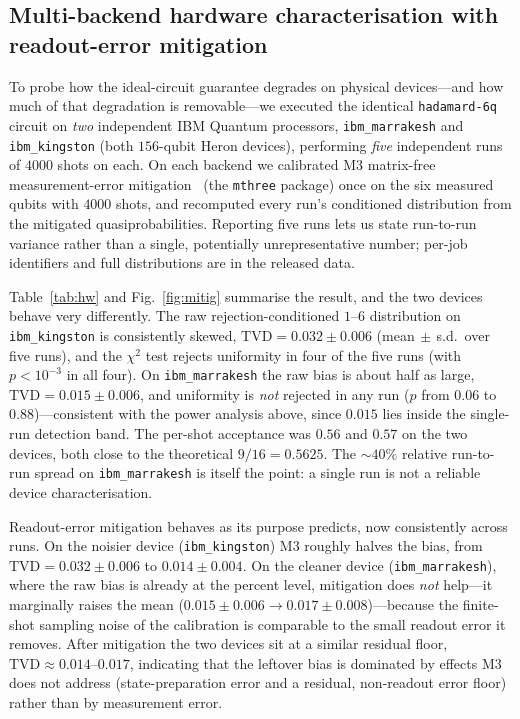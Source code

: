 \documentclass{ieeeaccess}
\begin{document}
\subsection{Multi-backend hardware characterisation with readout-error mitigation}
\label{sec:hw}

To probe how the ideal-circuit guarantee degrades on physical devices---and how much of that degradation is removable---we executed the identical \texttt{hadamard-6q} circuit on \emph{two} independent IBM Quantum processors, \texttt{ibm\_marrakesh} and \texttt{ibm\_kingston} (both $156$-qubit Heron devices), performing \emph{five} independent runs of $4000$ shots on each. On each backend we calibrated M3 matrix-free measurement-error mitigation~\cite{nation2021m3} (the \texttt{mthree} package) once on the six measured qubits with $4000$ shots, and recomputed every run's conditioned distribution from the mitigated quasiprobabilities. Reporting five runs lets us state run-to-run variance rather than a single, potentially unrepresentative number; per-job identifiers and full distributions are in the released data.

Table~\ref{tab:hw} and Fig.~\ref{fig:mitig} summarise the result, and the two devices behave very differently. The raw rejection-conditioned $1$--$6$ distribution on \texttt{ibm\_kingston} is consistently skewed, $\mathrm{TVD}=0.032\pm0.006$ (mean$\,\pm\,$s.d.\ over five runs), and the $\chi^2$ test rejects uniformity in four of the five runs (with $p<10^{-3}$ in all four). On \texttt{ibm\_marrakesh} the raw bias is about half as large, $\mathrm{TVD}=0.015\pm0.006$, and uniformity is \emph{not} rejected in any run ($p$ from $0.06$ to $0.88$)---consistent with the power analysis above, since $0.015$ lies inside the single-run detection band. The per-shot acceptance was $0.56$ and $0.57$ on the two devices, both close to the theoretical $9/16=0.5625$. The $\sim\!40\%$ relative run-to-run spread on \texttt{ibm\_marrakesh} is itself the point: a single run is not a reliable device characterisation.

Readout-error mitigation behaves as its purpose predicts, now consistently across runs. On the noisier device (\texttt{ibm\_kingston}) M3 roughly halves the bias, from $\mathrm{TVD}=0.032\pm0.006$ to $0.014\pm0.004$. On the cleaner device (\texttt{ibm\_marrakesh}), where the raw bias is already at the percent level, mitigation does \emph{not} help---it marginally raises the mean ($0.015\pm0.006\to0.017\pm0.008$)---because the finite-shot sampling noise of the calibration is comparable to the small readout error it removes. After mitigation the two devices sit at a similar residual floor, $\mathrm{TVD}\approx0.014$--$0.017$, indicating that the leftover bias is dominated by effects M3 does not address (state-preparation error and a residual, non-readout error floor) rather than by measurement error.
\end{document}

